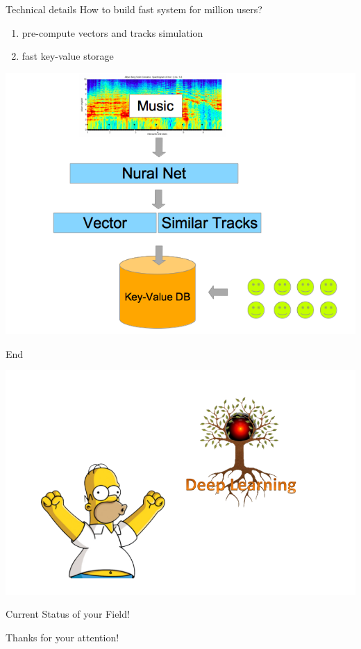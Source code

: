 \documentclass{beamer}
\begin{document}
\begin{frame}{Technical details} 
	How to build fast system for million users?
	\begin{enumerate}
		\item pre-compute vectors and tracks simulation 
		\item fast key-value storage
	\end{enumerate}
		\begin{center}				
			\includegraphics[scale=0.35]{img/prod}
		\end{center}
\end{frame}
	
\begin{frame}{End} 
	\begin{center}				
		\includegraphics[scale=0.35]{img/csf}
	
		{\huge Current Status of your Field!}
		
		Thanks for your attention!
	\end{center}
\end{frame}
\end{document}
